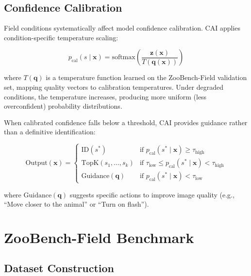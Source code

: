 \documentclass[11pt,a4paper]{article}
\begin{document}
\subsection{Confidence Calibration}

Field conditions systematically affect model confidence calibration.
CAI applies condition-specific temperature scaling:

\begin{equation}
    p_{\text{cal}}(s \mid \mathbf{x}) = \text{softmax}\left(\frac{\mathbf{z}(\mathbf{x})}{T(\mathbf{q}(\mathbf{x}))}\right)
\end{equation}

\noindent where $T(\mathbf{q})$ is a temperature function learned on the ZooBench-Field validation set, mapping quality vectors to calibration temperatures.
Under degraded conditions, the temperature increases, producing more uniform (less overconfident) probability distributions.

When calibrated confidence falls below a threshold, CAI provides guidance rather than a definitive identification:

\begin{equation}
    \text{Output}(\mathbf{x}) = \begin{cases}
        \text{ID}(s^*) & \text{if } p_{\text{cal}}(s^* \mid \mathbf{x}) \geq \tau_{\text{high}} \\
        \text{TopK}(s_1, \ldots, s_k) & \text{if } \tau_{\text{low}} \leq p_{\text{cal}}(s^* \mid \mathbf{x}) < \tau_{\text{high}} \\
        \text{Guidance}(\mathbf{q}) & \text{if } p_{\text{cal}}(s^* \mid \mathbf{x}) < \tau_{\text{low}}
    \end{cases}
\end{equation}

\noindent where $\text{Guidance}(\mathbf{q})$ suggests specific actions to improve image quality (e.g., ``Move closer to the animal'' or ``Turn on flash'').

\section{ZooBench-Field Benchmark}
\label{sec:benchmark}

\subsection{Dataset Construction}
\end{document}
